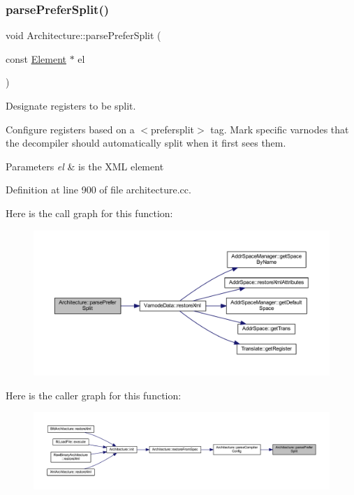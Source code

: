 \subsubsection{\texorpdfstring{parsePreferSplit()}{parsePreferSplit()}}
{\footnotesize\ttfamily void Architecture\+::parse\+Prefer\+Split (\begin{DoxyParamCaption}\item[{const \mbox{\hyperlink{class_element}{Element}} $\ast$}]{el }\end{DoxyParamCaption})\hspace{0.3cm}{\ttfamily [protected]}}



Designate registers to be split. 

Configure registers based on a $<$prefersplit$>$ tag. Mark specific varnodes that the decompiler should automatically split when it first sees them. 
\begin{DoxyParams}{Parameters}
{\em el} & is the X\+ML element \\
\hline
\end{DoxyParams}


Definition at line 900 of file architecture.\+cc.

Here is the call graph for this function\+:
\nopagebreak
\begin{figure}[H]
\begin{center}
\leavevmode
\includegraphics[width=350pt]{class_architecture_a7cbe749d5bcc143838f2590fc08acf26_cgraph}
\end{center}
\end{figure}
Here is the caller graph for this function\+:
\nopagebreak
\begin{figure}[H]
\begin{center}
\leavevmode
\includegraphics[width=350pt]{class_architecture_a7cbe749d5bcc143838f2590fc08acf26_icgraph}
\end{center}
\end{figure}
\mbox{\label{class_architecture_a4cd4815cc79c6582840043de2e3e65eb}} 
